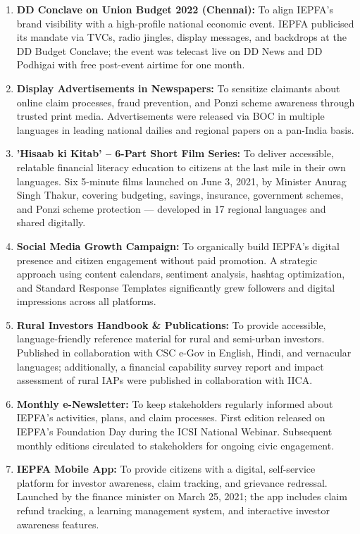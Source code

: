 \documentclass[openany]{book}
\begin{document}
\begin{enumerate}
    \item \textbf{DD Conclave on Union Budget 2022 (Chennai):} To align IEPFA's brand visibility with a high-profile national economic event. IEPFA publicised its mandate via TVCs, radio jingles, display messages, and backdrops at the DD Budget Conclave; the event was telecast live on DD News and DD Podhigai with free post-event airtime for one month.
    \item \textbf{Display Advertisements in Newspapers:} To sensitize claimants about online claim processes, fraud prevention, and Ponzi scheme awareness through trusted print media. Advertisements were released via BOC in multiple languages in leading national dailies and regional papers on a pan-India basis.
    \item \textbf{'Hisaab ki Kitab' – 6-Part Short Film Series:} To deliver accessible, relatable financial literacy education to citizens at the last mile in their own languages. Six 5-minute films launched on June 3, 2021, by Minister Anurag Singh Thakur, covering budgeting, savings, insurance, government schemes, and Ponzi scheme protection — developed in 17 regional languages and shared digitally.
    \item \textbf{Social Media Growth Campaign:} To organically build IEPFA's digital presence and citizen engagement without paid promotion. A strategic approach using content calendars, sentiment analysis, hashtag optimization, and Standard Response Templates significantly grew followers and digital impressions across all platforms.
    \item \textbf{Rural Investors Handbook \& Publications:} To provide accessible, language-friendly reference material for rural and semi-urban investors. Published in collaboration with CSC e-Gov in English, Hindi, and vernacular languages; additionally, a financial capability survey report and impact assessment of rural IAPs were published in collaboration with IICA.
    \item \textbf{Monthly e-Newsletter:} To keep stakeholders regularly informed about IEPFA's activities, plans, and claim processes. First edition released on IEPFA's Foundation Day during the ICSI National Webinar. Subsequent monthly editions circulated to stakeholders for ongoing civic engagement.
    \item \textbf{IEPFA Mobile App:} To provide citizens with a digital, self-service platform for investor awareness, claim tracking, and grievance redressal. Launched by the finance minister on March 25, 2021; the app includes claim refund tracking, a learning management system, and interactive investor awareness features.
\end{enumerate}
\end{document}

